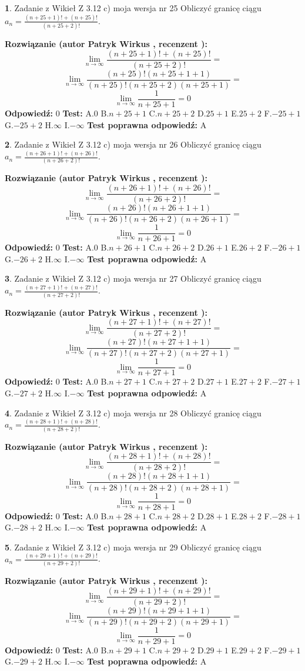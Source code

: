 \documentclass[12pt, a4paper]{article}
\theoremstyle{definition} %
\newtheorem{zad}{}
\newcommand{\zadStart}[1]{\begin{zad}#1\newline}
\newcommand{\zadStop}{\end{zad}}
\newcommand{\rozwStart}[2]{\noindent \textbf{Rozwiązanie (autor #1 , recenzent #2): }\newline}
\newcommand{\rozwStop}{\newline}
\newcommand{\odpStart}{\noindent \textbf{Odpowiedź:}\newline}
\newcommand{\odpStop}{\newline}
\newcommand{\testStart}{\noindent \textbf{Test:}\newline}
\newcommand{\testStop}{\newline}
\newcommand{\kluczStart}{\noindent \textbf{Test poprawna odpowiedź:}\newline}
\newcommand{\kluczStop}{\newline}
\begin{document}
\zadStart{Zadanie z Wikieł Z 3.12 c) moja wersja nr 25}
Obliczyć granicę ciągu $a_{n}=\frac{(n+25+1)!+(n+25)!}{(n+25+2)!}$.
\zadStop
\rozwStart{Patryk Wirkus}{}
$$\lim\limits_{n\to\infty}\frac{(n+25+1)!+(n+25)!}{(n+25+2)!}=$$
$$\lim\limits_{n\to\infty}\frac{(n+25)!(n+25+1+1)}{(n+25)!(n+25+2)(n+25+1)}=$$
$$\lim\limits_{n\to\infty}\frac{1}{n+25+1}= 0$$
\rozwStop
\odpStart
$0$
\odpStop
\testStart
A.$0$
B.$n+25+1$
C.$n+25+2$
D.$25+1$
E.$25+2$
F.$-25+1$
G.$-25+2$
H.$\infty$
I.$-\infty$
\testStop
\kluczStart
A
\kluczStop



\zadStart{Zadanie z Wikieł Z 3.12 c) moja wersja nr 26}
Obliczyć granicę ciągu $a_{n}=\frac{(n+26+1)!+(n+26)!}{(n+26+2)!}$.
\zadStop
\rozwStart{Patryk Wirkus}{}
$$\lim\limits_{n\to\infty}\frac{(n+26+1)!+(n+26)!}{(n+26+2)!}=$$
$$\lim\limits_{n\to\infty}\frac{(n+26)!(n+26+1+1)}{(n+26)!(n+26+2)(n+26+1)}=$$
$$\lim\limits_{n\to\infty}\frac{1}{n+26+1}= 0$$
\rozwStop
\odpStart
$0$
\odpStop
\testStart
A.$0$
B.$n+26+1$
C.$n+26+2$
D.$26+1$
E.$26+2$
F.$-26+1$
G.$-26+2$
H.$\infty$
I.$-\infty$
\testStop
\kluczStart
A
\kluczStop



\zadStart{Zadanie z Wikieł Z 3.12 c) moja wersja nr 27}
Obliczyć granicę ciągu $a_{n}=\frac{(n+27+1)!+(n+27)!}{(n+27+2)!}$.
\zadStop
\rozwStart{Patryk Wirkus}{}
$$\lim\limits_{n\to\infty}\frac{(n+27+1)!+(n+27)!}{(n+27+2)!}=$$
$$\lim\limits_{n\to\infty}\frac{(n+27)!(n+27+1+1)}{(n+27)!(n+27+2)(n+27+1)}=$$
$$\lim\limits_{n\to\infty}\frac{1}{n+27+1}= 0$$
\rozwStop
\odpStart
$0$
\odpStop
\testStart
A.$0$
B.$n+27+1$
C.$n+27+2$
D.$27+1$
E.$27+2$
F.$-27+1$
G.$-27+2$
H.$\infty$
I.$-\infty$
\testStop
\kluczStart
A
\kluczStop



\zadStart{Zadanie z Wikieł Z 3.12 c) moja wersja nr 28}
Obliczyć granicę ciągu $a_{n}=\frac{(n+28+1)!+(n+28)!}{(n+28+2)!}$.
\zadStop
\rozwStart{Patryk Wirkus}{}
$$\lim\limits_{n\to\infty}\frac{(n+28+1)!+(n+28)!}{(n+28+2)!}=$$
$$\lim\limits_{n\to\infty}\frac{(n+28)!(n+28+1+1)}{(n+28)!(n+28+2)(n+28+1)}=$$
$$\lim\limits_{n\to\infty}\frac{1}{n+28+1}= 0$$
\rozwStop
\odpStart
$0$
\odpStop
\testStart
A.$0$
B.$n+28+1$
C.$n+28+2$
D.$28+1$
E.$28+2$
F.$-28+1$
G.$-28+2$
H.$\infty$
I.$-\infty$
\testStop
\kluczStart
A
\kluczStop



\zadStart{Zadanie z Wikieł Z 3.12 c) moja wersja nr 29}
Obliczyć granicę ciągu $a_{n}=\frac{(n+29+1)!+(n+29)!}{(n+29+2)!}$.
\zadStop
\rozwStart{Patryk Wirkus}{}
$$\lim\limits_{n\to\infty}\frac{(n+29+1)!+(n+29)!}{(n+29+2)!}=$$
$$\lim\limits_{n\to\infty}\frac{(n+29)!(n+29+1+1)}{(n+29)!(n+29+2)(n+29+1)}=$$
$$\lim\limits_{n\to\infty}\frac{1}{n+29+1}= 0$$
\rozwStop
\odpStart
$0$
\odpStop
\testStart
A.$0$
B.$n+29+1$
C.$n+29+2$
D.$29+1$
E.$29+2$
F.$-29+1$
G.$-29+2$
H.$\infty$
I.$-\infty$
\testStop
\kluczStart
A
\kluczStop
\end{document}
